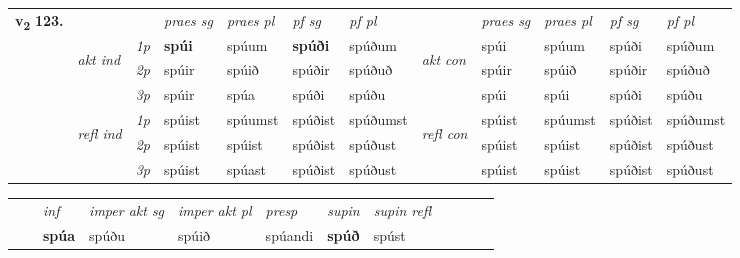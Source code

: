 \begin{tabular}{llllllllllll} \toprule
\multirow{4}{*}{{{\textbf{v{\textsubscript{2}}} \Large{\textbf{123.}}}}}  & &   &  \textit{praes sg}  & \textit{praes pl}  &\textit{ pf sg} & \textit{pf pl} &  &  \textit{praes sg}  & \textit{praes pl}  & \textit{pf sg} & \textit{pf pl } \\*
	\cmidrule{4-7} \cmidrule{9-12}
 & \multirow{3}{*}{\begin{turn}{90}\textit{akt ind}\end{turn}} & {\textit{1p}} & \textbf{spúi} & spúum    & \textbf{spúði} & spúðum & \multirow{3}{*}{\begin{turn}{90}\textit{akt con}\end{turn}} &spúi & spúum & spúði & spúðum\\*
& &  {\textit{2p}} &  spúir  & spúið   & spúðir & spúðuð & & spúir & spúið & spúðir & spúðuð \\*
& &  {\textit{3p}} & spúir & spúa   & spúði & spúðu & & spúi & spúi& spúði & spúðu  \\*
\cmidrule{4-7} \cmidrule{9-12}
 &\multirow{3}{*}{\begin{turn}{90}\textit{refl ind}\end{turn}} & {\textit{1p}} & spúist & spúumst    & spúðist & spúðumst & \multirow{3}{*}{\begin{turn}{90}\textit{refl con}\end{turn}}  &spúist & spúumst & spúðist & spúðumst\\*
 &&  {\textit{2p}} &  spúist  & spúist   & spúðist & spúðust & &spúist & spúist & spúðist & spúðust \\*
& &  {\textit{3p}} & spúist & spúast   & spúðist & spúðust & & spúist & spúist& spúðist & spúðust  \\*
\cmidrule{4-7} \cmidrule{9-12}
\end{tabular}


\begin{tabular}{llllllllllll}
 & & \textit{inf} & \textit{imper akt sg} & \textit{imper akt pl}   & \textit{presp} & \textit{supin} & \textit{supin refl}      \\*
  & & \textbf{spúa} & spúðu  & spúið   & spúandi &  \textbf{spúð} & spúst  \\*
\cmidrule{1-12}
\end{tabular}



